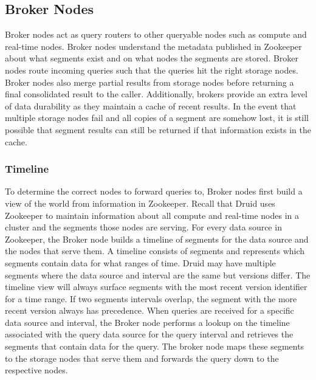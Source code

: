 \documentclass{vldb}
\begin{document}
\subsection{Broker Nodes}
Broker nodes act as query routers to other queryable nodes such as compute and real-time nodes. Broker nodes understand the metadata published in Zookeeper about what segments exist and on what nodes the
segments are stored. Broker nodes route incoming queries such that the queries hit
the right storage nodes. Broker nodes also merge partial results from
storage nodes before returning a final consolidated result to the
caller.  Additionally, brokers provide an extra level of data
durability as they maintain a cache of recent results. In the event
that multiple storage nodes fail and all copies of a segment are
somehow lost, it is still possible that segment results can still be
returned if that information exists in the cache.

\subsubsection{Timeline}
To determine the correct nodes to forward queries to, Broker nodes
first build a view of the world from information in Zookeeper. Recall
that Druid uses Zookeeper to maintain information about all compute
and real-time nodes in a cluster and the segments those nodes are
serving. For every data source in Zookeeper, the Broker node builds a
timeline of segments for the data source and the nodes that serve them. A timeline
consists of segments and represents which segments contain data for
what ranges of time. Druid may have multiple segments where the data
source and interval are the same but versions differ. The timeline
view will always surface segments with the most recent version
identifier for a time range. If two segments intervals overlap, the segment with the more recent
version always has precedence. When queries are received for a specific
data source and interval, the Broker node performs a lookup on the
timeline associated with the query data source for the query interval
and retrieves the segments that contain data for the query. The broker
node maps these segments to the storage nodes that serve them and
forwards the query down to the respective nodes.
\end{document}
